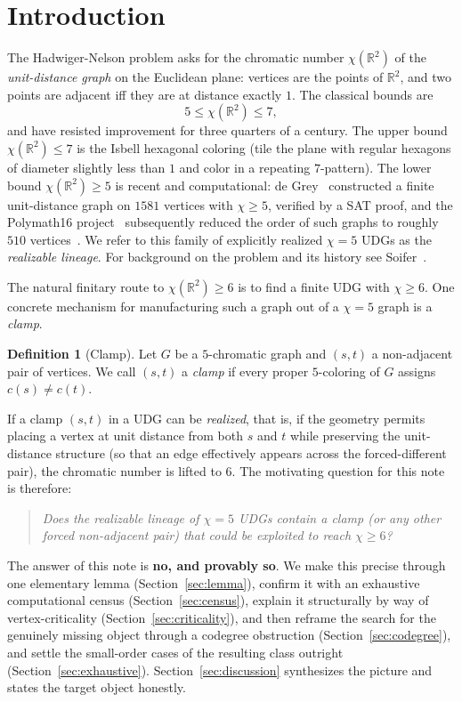 \documentclass[11pt]{article}
\theoremstyle{definition}
\newtheorem{definition}{Definition}
\newcommand{\R}{\mathbb{R}}
\newcommand{\chrom}{\chi}
\begin{document}
\section{Introduction}
\label{sec:intro}

The Hadwiger-Nelson problem asks for the chromatic number $\chrom(\R^2)$ of the
\emph{unit-distance graph} on the Euclidean plane: vertices are the points of
$\R^2$, and two points are adjacent iff they are at distance exactly $1$. The
classical bounds are
\[
  5 \le \chrom(\R^2) \le 7,
\]
and have resisted improvement for three quarters of a century. The upper bound
$\chrom(\R^2) \le 7$ is the Isbell hexagonal coloring (tile the plane with regular
hexagons of diameter slightly less than $1$ and color in a repeating
$7$-pattern). The lower bound $\chrom(\R^2) \ge 5$ is recent and computational:
de Grey~\cite{deGrey2018} constructed a finite unit-distance graph on $1581$
vertices with $\chrom \ge 5$, verified by a SAT proof, and the Polymath16
project~\cite{Polymath16} subsequently reduced the order of such graphs to
roughly $510$ vertices~\cite{Parts2020}. We refer to this family of explicitly realized $\chrom=5$
UDGs as the \emph{realizable lineage}. For background on the problem and its
history see Soifer~\cite{Soifer2009}.

The natural finitary route to $\chrom(\R^2) \ge 6$ is to find a finite UDG with
$\chrom \ge 6$. One concrete mechanism for manufacturing such a graph out of a
$\chrom=5$ graph is a \emph{clamp}.

\begin{definition}[Clamp]
\label{def:clamp}
Let $G$ be a $5$-chromatic graph and $(s,t)$ a non-adjacent pair of vertices. We
call $(s,t)$ a \emph{clamp} if every proper $5$-coloring of $G$ assigns
$c(s) \ne c(t)$.
\end{definition}

If a clamp $(s,t)$ in a UDG can be \emph{realized}, that is, if the geometry
permits placing a vertex at unit distance from both $s$ and $t$ while preserving
the unit-distance structure (so that an edge effectively appears across the
forced-different pair), the chromatic number is lifted to $6$. The motivating
question for this note is therefore:
\begin{quote}
\emph{Does the realizable lineage of $\chrom = 5$ UDGs contain a clamp (or any
other forced non-adjacent pair) that could be exploited to reach
$\chrom \ge 6$?}
\end{quote}
The answer of this note is \textbf{no, and provably so}. We make this precise
through one elementary lemma (Section~\ref{sec:lemma}), confirm it with an
exhaustive computational census (Section~\ref{sec:census}), explain it
structurally by way of vertex-criticality (Section~\ref{sec:criticality}), and
then reframe the search for the genuinely missing object through a codegree
obstruction (Section~\ref{sec:codegree}), and settle the small-order cases of
the resulting class outright (Section~\ref{sec:exhaustive}).
Section~\ref{sec:discussion} synthesizes the picture and states the target
object honestly.
\end{document}
